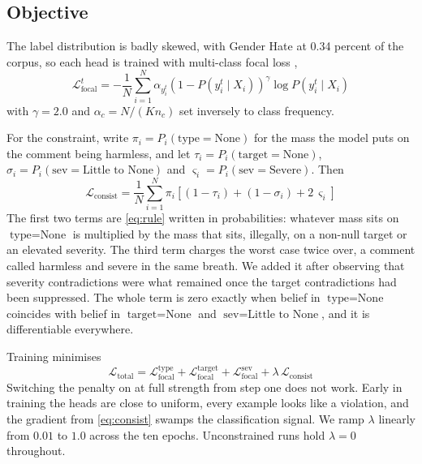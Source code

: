 \documentclass[conference]{IEEEtran}
\begin{document}
\subsection{Objective}
The label distribution is badly skewed, with Gender Hate at 0.34 percent of the corpus, so each head is trained with multi-class focal loss \cite{lin2017focal},
\begin{equation}
\mathcal{L}_{\text{focal}}^t = -\frac{1}{N} \sum_{i=1}^N \alpha_{y_i^t} \left(1 - P(y_i^t \mid X_i)\right)^\gamma \log P(y_i^t \mid X_i)
\end{equation}
with $\gamma = 2.0$ and $\alpha_c = N / (K n_c)$ set inversely to class frequency.

For the constraint, write $\pi_i = P_i(\text{type}{=}\text{None})$ for the mass the model puts on the comment being harmless, and let $\tau_i = P_i(\text{target}{=}\text{None})$, $\sigma_i = P_i(\text{sev}{=}\text{Little to None})$ and $\varsigma_i = P_i(\text{sev}{=}\text{Severe})$. Then
\begin{equation}
\mathcal{L}_{\text{consist}} = \frac{1}{N} \sum_{i=1}^{N} \pi_i \left[ (1 - \tau_i) + (1 - \sigma_i) + 2\,\varsigma_i \right]
\label{eq:consist}
\end{equation}
The first two terms are \eqref{eq:rule} written in probabilities: whatever mass sits on $\text{type}=\text{None}$ is multiplied by the mass that sits, illegally, on a non-null target or an elevated severity. The third term charges the worst case twice over, a comment called harmless and severe in the same breath. We added it after observing that severity contradictions were what remained once the target contradictions had been suppressed. The whole term is zero exactly when belief in $\text{type}=\text{None}$ coincides with belief in $\text{target}=\text{None}$ and $\text{sev}=\text{Little to None}$, and it is differentiable everywhere.

Training minimises
\begin{equation}
\mathcal{L}_{\text{total}} = \mathcal{L}_{\text{focal}}^{\text{type}} + \mathcal{L}_{\text{focal}}^{\text{target}} + \mathcal{L}_{\text{focal}}^{\text{sev}} + \lambda \, \mathcal{L}_{\text{consist}}
\end{equation}
Switching the penalty on at full strength from step one does not work. Early in training the heads are close to uniform, every example looks like a violation, and the gradient from \eqref{eq:consist} swamps the classification signal. We ramp $\lambda$ linearly from $0.01$ to $1.0$ across the ten epochs. Unconstrained runs hold $\lambda = 0$ throughout.
\end{document}
